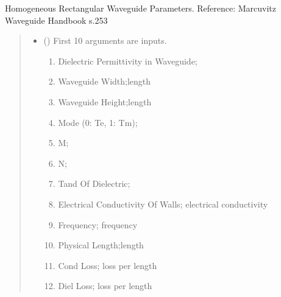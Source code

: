\documentclass[letterpaper,10pt,english]{sphinxmanual}
\begin{document}
\begin{fulllineitems}
\label{\detokenize{components:components.HomogeneousRectWaveguideParameters_TE}}
\pysigstartsignatures
{}
\pysigstopsignatures
\sphinxAtStartPar
Homogeneous Rectangular Waveguide Parameters.
Reference:  Marcuvitz Waveguide Handbook s.253
\begin{quote}\begin{description}
\begin{itemize}
\item {} 
\sphinxAtStartPar
{} () \textendash{} 
\sphinxAtStartPar
First 10 arguments are inputs.
\begin{enumerate}
%
\item {} 
\sphinxAtStartPar
Dielectric Permittivity in Waveguide;

\item {} 
\sphinxAtStartPar
Waveguide Width;length

\item {} 
\sphinxAtStartPar
Waveguide Height;length

\item {} 
\sphinxAtStartPar
Mode (0: Te, 1: Tm);

\item {} 
\sphinxAtStartPar
M;

\item {} 
\sphinxAtStartPar
N;

\item {} 
\sphinxAtStartPar
Tand Of Dielectric;

\item {} 
\sphinxAtStartPar
Electrical Conductivity Of Walls; electrical conductivity

\item {} 
\sphinxAtStartPar
Frequency; frequency

\item {} 
\sphinxAtStartPar
Physical Length;length

\item {} 
\sphinxAtStartPar
Cond Loss; loss per length

\item {} 
\sphinxAtStartPar
Diel Loss; loss per length


\end{enumerate}
\end{itemize}
\end{description}
\end{quote}
\end{fulllineitems}
\end{document}

